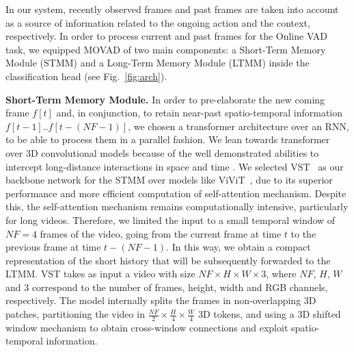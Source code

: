 In our system, recently observed frames and past frames are taken into account as a source of information related to the ongoing action and the context, respectively.
In order to process current and past frames for the Online VAD task, we equipped MOVAD of two main components: a Short-Term Memory Module (STMM) and a Long-Term Memory Module (LTMM) inside the classification head (see Fig.~\ref{fig:arch}). 

\noindent\textbf{Short-Term Memory Module.}
In order to pre-elaborate the new coming frame $f[t]$ and, in conjunction, to retain near-past spatio-temporal information $f[t-1] .. f[t-\left(\mathit{NF}-1\right)]$, we chosen a transformer architecture over an RNN, to be able to process them in a parallel fashion.
We lean towards transformer over 3D convolutional models because of the well demonstrated abilities to intercept long-distance interactions in space and time \cite{moutik2023convolutional}.
We selected VST~\cite{liu_video_2022} as our backbone network for the STMM over models like ViViT~\cite{Arnab_2021_ICCV}, due to its superior performance and more efficient computation of self-attention mechanism.
Despite this, the self-attention mechanism remains computationally intensive, particularly for long videos. 
Therefore, we limited the input to a small temporal window of $\mathit{NF} = 4$ frames of the video, going from the current frame at time $t$ to the previous frame at time $t-\left(\mathit{NF}-1\right)$.
In this way, we obtain a compact representation of the short history that will be subsequently forwarded to the LTMM.
VST takes as input a video with size $\mathit{NF} \times H \times W \times 3$, where $\mathit{NF}$, $H$, $W$ and $3$ correspond to the number of frames, height, width and RGB channels, respectively.
The model internally splits the frames in non-overlapping 3D patches, partitioning the video in $\frac{\mathit{NF}}{2} \times \frac{H}{4} \times \frac{W}{4}$ 3D tokens, and using a 3D shifted window mechanism to obtain cross-window connections and exploit spatio-temporal information.

